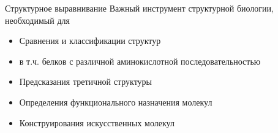 \documentclass[utf8, professionalfonts]{beamer}
\begin{document}
\begin{frame}{Структурное выравнивание}
Важный инструмент структурной биологии, необходимый для

\begin{itemize}
	\item Сравнения и классификации структур
	\item в т.ч. белков с различной аминокислотной последовательностью
	\item Предсказания третичной структуры
	\item Определения функционального назначения молекул
	\item Конструирования искусственных молекул
\end{itemize}

\end{frame}
\end{document}
